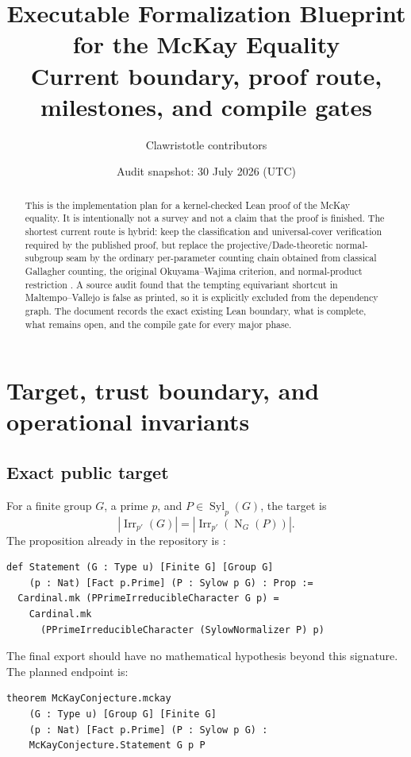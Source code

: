 \documentclass[11pt]{article}
\title{\textbf{Executable Formalization Blueprint for the McKay Equality}\\
\large Current boundary, proof route, milestones, and compile gates}
\author{Clawristotle contributors}
\date{Audit snapshot: 30 July 2026 (UTC)}
\newcommand{\Irr}{\operatorname{Irr}}
\newcommand{\Norm}{\operatorname{N}}
\newcommand{\Syl}{\operatorname{Syl}}
\begin{document}
\maketitle

\begin{abstract}
This is the implementation plan for a kernel-checked Lean proof of the
McKay equality.  It is intentionally not a survey and not a claim that the
proof is finished.  The shortest current route is hybrid: keep the
classification and universal-cover verification required by the published
proof, but replace the projective/Dade-theoretic normal-subgroup seam by the
ordinary per-parameter counting chain obtained from classical Gallagher
counting, the original Okuyama--Wajima criterion, and normal-product
restriction \cite{Murray2023,Navarro2018,OkuyamaWajima1980}.  A source audit found that
the tempting equivariant shortcut in Maltempo--Vallejo
\cite{MaltempoVallejo2026} is false as printed, so it is explicitly excluded
from the dependency graph.  The document records the exact existing Lean
boundary, what is complete, what remains open, and the compile gate for every
major phase.
\end{abstract}

\tableofcontents

\section{Target, trust boundary, and operational invariants}

\subsection{Exact public target}

For a finite group \(G\), a prime \(p\), and \(P\in\Syl_p(G)\), the target is
\[
  |\Irr_{p'}(G)|=|\Irr_{p'}(\Norm_G(P))|.
\]
The proposition already in the repository is
:

\begin{lstlisting}
def Statement (G : Type u) [Finite G] [Group G]
    (p : Nat) [Fact p.Prime] (P : Sylow p G) : Prop :=
  Cardinal.mk (PPrimeIrreducibleCharacter G p) =
    Cardinal.mk
      (PPrimeIrreducibleCharacter (SylowNormalizer P) p)
\end{lstlisting}

The final export should have no mathematical hypothesis beyond this
signature.  The planned endpoint is:

\begin{lstlisting}
theorem McKayConjecture.mckay
    (G : Type u) [Group G] [Finite G]
    (p : Nat) [Fact p.Prime] (P : Sylow p G) :
    McKayConjecture.Statement G p P
\end{lstlisting}
\end{document}
